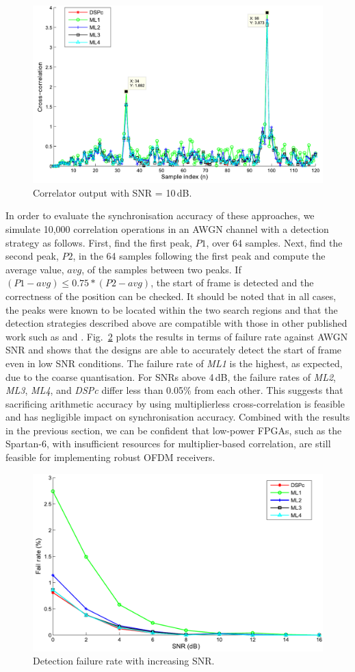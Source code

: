 \begin{figure}
	\centerline{\includegraphics [width=0.6\columnwidth] {figures/Plot_XCR.pdf} }
	\caption{Correlator output with SNR = 10\,dB.}
	\label{fig:Plot_XCR}
\end{figure}

In order to evaluate the synchronisation accuracy of these approaches, we simulate 10,000 correlation operations in an AWGN channel with a detection strategy as follows.
First, find the first peak, $P1$, over 64 samples.
Next, find the second peak, $P2$, in the 64 samples following the first peak and compute the average value, $avg$, of the samples between two peaks.
If  $( P1 - avg ) \le  0.75 * ( P2 - avg )$, the start of frame is detected and the correctness of the position can be checked.
It should be noted that in all cases, the peaks were known to be located within the two search regions and that the detection strategies described above are compatible with those in other published work such as \cite{Kishore2006} and \cite{Yip2003}.
Fig.~\ref{fig:Plot_NFail} plots the results in terms of failure rate against AWGN SNR and shows that the designs are able to accurately detect the start of frame even in low SNR conditions.
The failure rate of \emph{ML1} is the highest, as expected, due to the coarse quantisation.
For SNRs above 4\,dB, the failure rates of \emph{ML2}, \emph{ML3}, \emph{ML4}, and \emph{DSPc} differ less than 0.05\% from each other.
This suggests that sacrificing arithmetic accuracy by using multiplierless cross-correlation is feasible and has negligible impact on synchronisation accuracy.
Combined with the results in the previous section, we can be confident that low-power FPGAs, such as the Spartan-6, with insufficient resources for multiplier-based correlation, are still feasible for implementing robust OFDM receivers.

\begin{figure}
	\centerline{\includegraphics [width=0.6\columnwidth] {figures/Plot_NFail.pdf} }
	\caption{Detection failure rate with increasing SNR.}
	\label{fig:Plot_NFail}
\end{figure}

